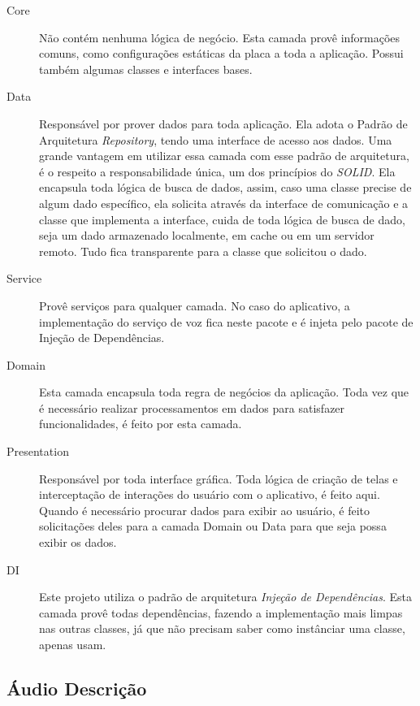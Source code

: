 \documentclass[a4paper, 12pt]{article}
\begin{document}
\begin{description}

\item[Core] Não contém nenhuma lógica de negócio. Esta camada provê informações comuns, como configurações estáticas da placa a toda a aplicação. Possui também algumas classes e interfaces bases.

\item[Data] Responsável por prover dados para toda aplicação. Ela adota o Padrão de Arquitetura \textit{Repository}, tendo uma interface de acesso aos dados. Uma grande vantagem em utilizar essa camada com esse padrão de arquitetura, é o respeito a responsabilidade única, um dos princípios do \textit{SOLID}. Ela encapsula toda lógica de busca de dados, assim, caso uma classe precise de algum dado específico, ela solicita através da interface de comunicação e a classe que implementa a interface, cuida de toda lógica de busca de dado, seja um dado armazenado localmente, em cache ou em um servidor remoto. Tudo fica transparente para a classe que solicitou o dado.

\item[Service] Provê serviços para qualquer camada. No caso do aplicativo, a implementação do serviço de voz fica neste pacote e é injeta pelo pacote de Injeção de Dependências.

\item[Domain] Esta camada encapsula toda regra de negócios da aplicação. Toda vez que é necessário realizar processamentos em dados para satisfazer funcionalidades, é feito por esta camada.

\item[Presentation] Responsável por toda interface gráfica. Toda lógica de criação de telas e interceptação de interações do usuário com o aplicativo, é feito aqui. Quando é necessário procurar dados para exibir ao usuário, é feito solicitações deles para a camada Domain ou Data para que seja possa exibir os dados.

\item[DI] Este projeto utiliza o padrão de arquitetura \textit{Injeção de Dependências}. Esta camada provê todas dependências, fazendo a implementação mais limpas nas outras classes, já que não precisam saber como instânciar uma classe, apenas usam.
 
\end{description}

\subsection{Áudio Descrição}
\end{document}
